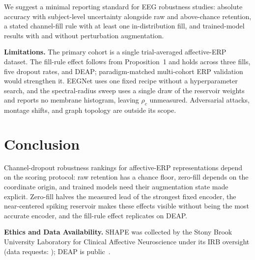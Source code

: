 \documentclass[conference]{IEEEtran}
\begin{document}
We suggest a minimal reporting standard for EEG robustness studies: absolute accuracy with subject-level uncertainty alongside raw and above-chance retention, a stated channel-fill rule with at least one in-distribution fill, and trained-model results with and without perturbation augmentation.

\textbf{Limitations.} The primary cohort is a single trial-averaged affective-ERP dataset. The fill-rule effect follows from Proposition~1 and holds across three fills, five dropout rates, and DEAP; paradigm-matched multi-cohort ERP validation would strengthen it. EEGNet uses one fixed recipe without a hyperparameter search, and the spectral-radius sweep uses a single draw of the reservoir weights and reports no membrane histogram, leaving $\rho_c$ unmeasured. Adversarial attacks, montage shifts, and graph topology are outside its scope.

\section{Conclusion}
Channel-dropout robustness rankings for affective-ERP representations depend on the scoring protocol: raw retention has a chance floor, zero-fill depends on the coordinate origin, and trained models need their augmentation state made explicit. Zero-fill halves the measured lead of the strongest fixed encoder, the near-centered spiking reservoir makes these effects visible without being the most accurate encoder, and the fill-rule effect replicates on DEAP.

\textbf{Ethics and Data Availability.} SHAPE was collected by the Stony Brook University Laboratory for Clinical Affective Neuroscience under its IRB oversight (data requests: \cite{shape}); DEAP is public~\cite{koelstra2012deap}.
\end{document}
